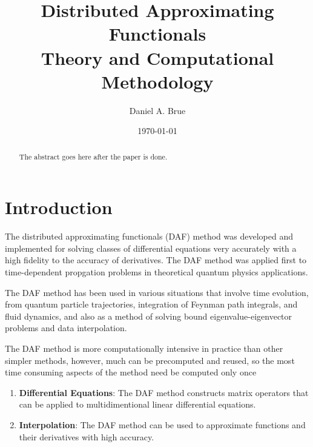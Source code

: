 \documentclass[preprint]{revtex4}
\begin{document}
\title{%
    Distributed Approximating Functionals\\
    {\small Theory and Computational Methodology}\\
}
\author{Daniel A. Brue}
\date{\today}

\begin{abstract}
The abstract goes here after the paper is done.
\end{abstract}

\maketitle

\section{Introduction}
The distributed approximating functionals (DAF) method was developed 
and implemented for solving classes of differential equations very accurately
with a high fidelity to the accuracy of derivatives. 
The DAF method was applied first to time-dependent propgation problems in theoretical
quantum physics applications\cite{Kouri-DAF1,Kouri-DAF2,Kouri-DAF3,Kouri-DAF4,
Kouri-DAF5,Kouri-DAF6,Kouri-DAF7}.

The DAF method has been used in various situations that involve time evolution, 
from quantum particle trajectories\cite{QTM}, integration of Feynman path integrals\cite{DAF-Szalay1},
and fluid dynamics\cite{NVS,Burgers}, and also as a method of solving bound eigenvalue-eigenvector
problems\cite{DAF-Szalay2,SGWD} and data interpolation\cite{DAF-Szalay3}.

The DAF method is more computationally intensive in practice than other simpler methods, 
however, much can be precomputed and reused, so the most time consuming aspects of the
method need be computed only once 

\begin{enumerate}
\item{\bf Differential Equations}: The DAF method constructs matrix operators that
	can be applied to multidimentional linear differential equations. 
\item{\bf Interpolation}: The DAF method can be used to approximate functions and
	their derivatives with high accuracy. 
\end{enumerate}

\end{document}
